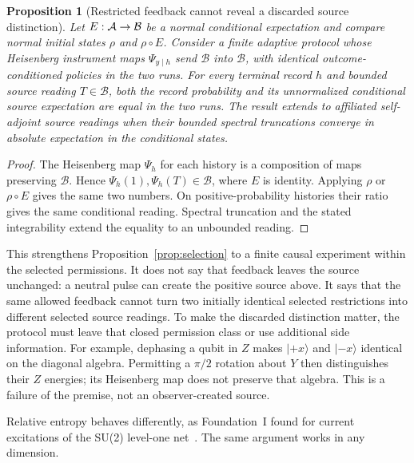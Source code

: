 \documentclass[12pt]{article}
\newtheorem{proposition}[theorem]{Proposition}
\theoremstyle{definition}
\theoremstyle{remark}
\begin{document}
\begin{proposition}[Restricted feedback cannot reveal a discarded source distinction]
\label{prop:restricted-feedback}
Let $E:{\cal A}\to{\cal B}$ be a normal conditional expectation and compare normal initial states $\rho$ and $\rho\circ E$. Consider a finite adaptive protocol whose Heisenberg instrument maps $\Psi_{y\mid h}$ send $\mathcal B$ into $\mathcal B$, with identical outcome-conditioned policies in the two runs. For every terminal record $h$ and bounded source reading $T\in\mathcal B$, both the record probability and its unnormalized conditional source expectation are equal in the two runs. The result extends to affiliated self-adjoint source readings when their bounded spectral truncations converge in absolute expectation in the conditional states.
\end{proposition}
\begin{proof}
The Heisenberg map $\Psi_h$ for each history is a composition of maps preserving $\mathcal B$. Hence $\Psi_h(1),\Psi_h(T)\in\mathcal B$, where $E$ is identity. Applying $\rho$ or $\rho\circ E$ gives the same two numbers. On positive-probability histories their ratio gives the same conditional reading. Spectral truncation and the stated integrability extend the equality to an unbounded reading.
\end{proof}

This strengthens Proposition~\ref{prop:selection} to a finite causal experiment within the selected permissions. It does not say that feedback leaves the source unchanged: a neutral pulse can create the positive source above. It says that the same allowed feedback cannot turn two initially identical selected restrictions into different selected source readings. To make the discarded distinction matter, the protocol must leave that closed permission class or use additional side information. For example, dephasing a qubit in $Z$ makes $|+x\rangle$ and $|-x\rangle$ identical on the diagonal algebra. Permitting a $\pi/2$ rotation about $Y$ then distinguishes their $Z$ energies; its Heisenberg map does not preserve that algebra. This is a failure of the premise, not an observer-created source.

Relative entropy behaves differently, as Foundation~I found for current excitations of the
SU(2) level-one net~\cite{FoundationI}. The same argument works in any dimension.
\end{document}
